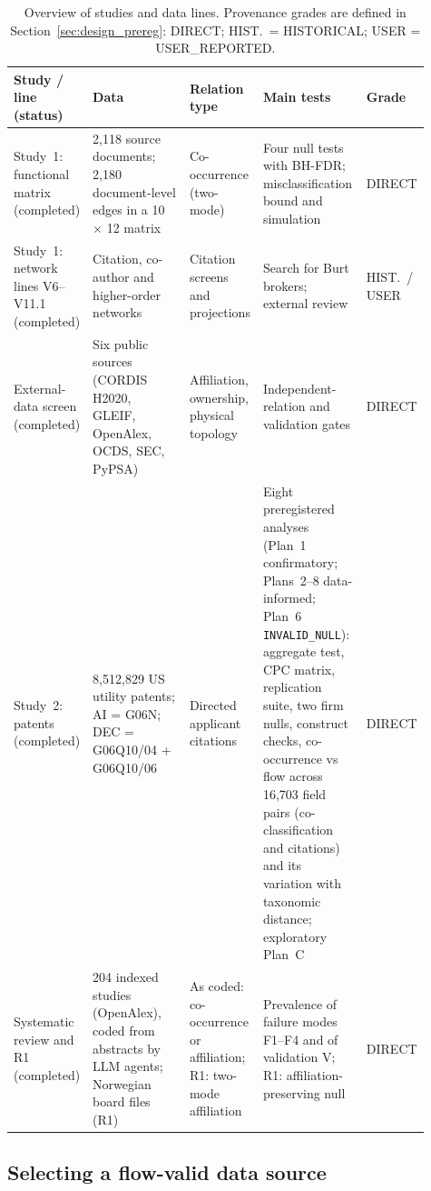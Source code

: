 \begin{table}[tbp]
\centering
\footnotesize
\setlength{\tabcolsep}{4pt}
\caption{Overview of studies and data lines. Provenance grades are defined in Section~\ref{sec:design_prereg}: DIRECT; HIST.\ = HISTORICAL; USER = USER\_REPORTED.}
\label{tab:front_overview}
\begin{tabular}{@{}p{0.16\linewidth}p{0.25\linewidth}p{0.16\linewidth}p{0.25\linewidth}p{0.09\linewidth}@{}}
\toprule
Study / line (status) & Data & Relation type & Main tests & Grade \tabularnewline
\midrule
\raggedright Study~1: functional matrix (completed) &
\raggedright 2,118 source documents; 2,180 document-level edges in a 10 $\times$ 12 matrix &
\raggedright Co-occurrence (two-mode) &
\raggedright Four null tests with BH-FDR; misclassification bound and simulation &
\raggedright DIRECT \tabularnewline
\addlinespace
\raggedright Study~1: network lines V6--V11.1 (completed) &
\raggedright Citation, co-author and higher-order networks &
\raggedright Citation screens and projections &
\raggedright Search for Burt brokers; external review &
\raggedright HIST.\ / USER \tabularnewline
\addlinespace
\raggedright External-data screen (completed) &
\raggedright Six public sources (CORDIS H2020, GLEIF, OpenAlex, OCDS, SEC, PyPSA) &
\raggedright Affiliation, ownership, physical topology &
\raggedright Independent-relation and validation gates &
\raggedright DIRECT \tabularnewline
\addlinespace
\raggedright Study~2: patents (completed) &
\raggedright 8,512,829 US utility patents; AI = G06N; DEC = G06Q10/04 + G06Q10/06 &
\raggedright Directed applicant citations &
\raggedright Eight preregistered analyses (Plan~1 confirmatory; Plans~2--8 data-informed; Plan~6 \texttt{INVALID\_\allowbreak NULL}): aggregate test, CPC matrix, replication suite, two firm nulls, construct checks, co-occurrence vs flow across 16,703 field pairs (co-classification and citations) and its variation with taxonomic distance; exploratory Plan~C &
\raggedright DIRECT \tabularnewline
\addlinespace
\raggedright Systematic review and R1 (completed) &
\raggedright 204 indexed studies (OpenAlex), coded from abstracts by LLM agents; Norwegian board files (R1) &
\raggedright As coded: co-occurrence or affiliation; R1: two-mode affiliation &
\raggedright Prevalence of failure modes F1--F4 and of validation V; R1: affiliation-preserving null &
\raggedright DIRECT \tabularnewline
\bottomrule
\end{tabular}
\end{table}

\subsection{Selecting a flow-valid data source}
\label{sec:design_sources}

